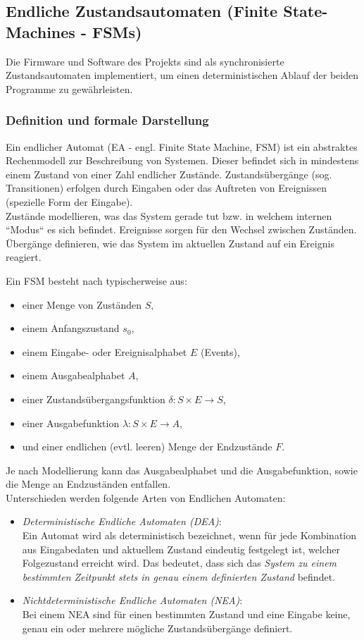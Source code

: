 \documentclass[a4paper, portrait, 12pt]{scrartcl} %
\begin{document}
\pagebreak

\subsection{Endliche Zustandsautomaten (Finite State-Machines - FSMs)}
\label{subsec:fsm}
Die Firmware und Software des Projekts sind als synchronisierte Zustandsautomaten implementiert, um einen deterministischen Ablauf der beiden Programme zu gewährleisten.
\subsubsection{Definition und formale Darstellung}
Ein endlicher Automat (EA - engl. Finite State Machine, FSM) ist ein abstraktes Rechenmodell zur Beschreibung von Systemen. Dieser befindet sich in mindestens einem Zustand von einer Zahl endlicher Zustände. Zustandsübergänge (sog. Transitionen) erfolgen durch Eingaben oder das Auftreten von Ereignissen (spezielle Form der Eingabe).\\

Zustände modellieren, was das System gerade tut bzw. in welchem internen ``Modus`` es sich befindet. Ereignisse sorgen für den Wechsel zwischen Zuständen. Übergänge definieren, wie das System im aktuellen Zustand auf ein Ereignis reagiert.

Ein FSM besteht nach \cite[S. 7ff]{Baesig2019} typischerweise aus:
\begin{itemize}
	\item einer Menge von Zuständen $S$,
	\item einem Anfangszustand $s_0$,
	\item einem Eingabe- oder Ereignisalphabet $E$ (Events),
	\item einem Ausgabealphabet $A$,
	\item einer Zustandsübergangsfunktion $\delta :S\times E\rightarrow S$,
	\item einer Ausgabefunktion $\lambda :S\times E\rightarrow A$,
	\item und einer endlichen (evtl. leeren) Menge der Endzustände $F$.
\end{itemize}

Je nach Modellierung kann das Ausgabealphabet und die Ausgabefunktion, sowie die Menge an Endzuständen entfallen.\\

Unterschieden werden folgende Arten von Endlichen Automaten:
\begin{itemize}
	\item \emph{Deterministische Endliche Automaten (DEA)}:\\
	Ein Automat wird als deterministisch bezeichnet, wenn für jede Kombination aus Eingabedaten und aktuellem Zustand eindeutig festgelegt ist, welcher Folgezustand erreicht wird. Das bedeutet, dass sich das \emph{System zu einem bestimmten Zeitpunkt stets in genau einem definierten Zustand} befindet.
	\item \emph{Nichtdeterministische Endliche Automaten (NEA)}:\\
	Bei einem NEA sind für einen bestimmten Zustand und eine Eingabe keine, genau ein oder mehrere mögliche Zustandsübergänge definiert.
\end{itemize}
\end{document}
